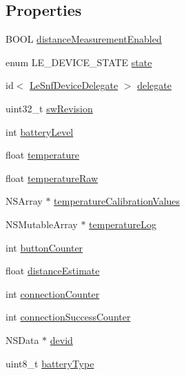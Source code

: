 \subsection*{Properties}
\begin{DoxyCompactItemize}
\item 
B\+O\+O\+L \hyperlink{interface_le_snf_device_a21f7ccd07695a5dec79fa82a6cce2b17}{distance\+Measurement\+Enabled}
\item 
enum L\+E\+\_\+\+D\+E\+V\+I\+C\+E\+\_\+\+S\+T\+A\+T\+E \hyperlink{interface_le_snf_device_a55e2289b72eb76ecd680df1e988d9814}{state}
\item 
id$<$ \hyperlink{protocol_le_snf_device_delegate-p}{Le\+Snf\+Device\+Delegate} $>$ \hyperlink{interface_le_snf_device_ab0bd07be677cb82e236c31730a4e56ae}{delegate}
\item 
uint32\+\_\+t \hyperlink{interface_le_snf_device_a87d28e38945f818bc093da48ecdbb182}{sw\+Revision}
\item 
int \hyperlink{interface_le_snf_device_ac2b0d74394b6ba30b0306ef86a4504c9}{battery\+Level}
\item 
float \hyperlink{interface_le_snf_device_a8bb8a1bce35bd386ac909c35215a4b8a}{temperature}
\item 
float \hyperlink{interface_le_snf_device_a8cdcdf37d487556008e5421dc353ac3a}{temperature\+Raw}
\item 
N\+S\+Array $\ast$ \hyperlink{interface_le_snf_device_a06108c7aecbfe26a075ce43fa010333f}{temperature\+Calibration\+Values}
\item 
N\+S\+Mutable\+Array $\ast$ \hyperlink{interface_le_snf_device_a0e3007ac5be7500511a19704b7223af2}{temperature\+Log}
\item 
int \hyperlink{interface_le_snf_device_aa38afc50f6dd03cc391715cbc8186111}{button\+Counter}
\item 
float \hyperlink{interface_le_snf_device_ab5b9db7753a961a6062947950e516688}{distance\+Estimate}
\item 
int \hyperlink{interface_le_snf_device_ad640963aa99ea3073ecc6d526d75c113}{connection\+Counter}
\item 
int \hyperlink{interface_le_snf_device_a8a5dfc51f0558ed63728b030986603f1}{connection\+Success\+Counter}
\item 
N\+S\+Data $\ast$ \hyperlink{interface_le_snf_device_a5981e716effb9c1bc130c68384065cdd}{devid}
\item 
uint8\+\_\+t \hyperlink{interface_le_snf_device_aa5fd5e351c6b9da96031fa5574e4873d}{battery\+Type}
\item 

\end{DoxyCompactItemize}
